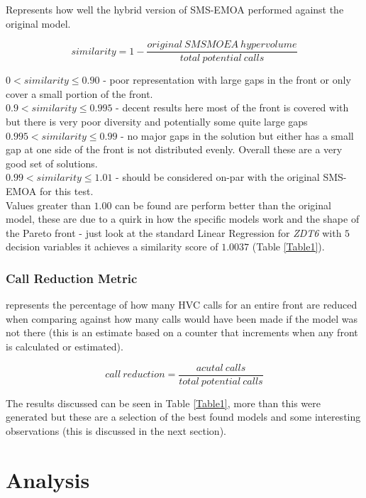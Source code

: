 \documentclass[sigconf,review,nonacm]{acmart}
\begin{document}
Represents how well the hybrid version of SMS-EMOA performed against the original model.

$$
    similarity = 1 - \frac{original\ SMSMOEA\ hypervolume}{total\ potential\ calls}
$$

$0 < similarity \leq 0.90$ - poor representation with large gaps in the front or only cover a small portion of the front. \\

$0.9 < similarity \leq 0.995 $ - decent results here most of the front is covered with but there is very poor diversity and potentially some quite large gaps \\

$0.995 < similarity \leq 0.99 $ - no major gaps in the solution but either has a small gap at one side of the front is not distributed evenly. Overall these are a very good set of solutions.  \\

$0.99 < similarity \leq 1.01$ - should be considered on-par with the original SMS-EMOA for this test. \\ Values greater than $1.00$ can be found are perform better than the original model, these are due to a quirk in how the specific models work and the shape of the Pareto front - just look at the standard Linear Regression for \textit{ZDT6} with $5$ decision variables it achieves a similarity score of $1.0037$ (Table \ref{Table1}).

\subsubsection{Call Reduction Metric} 

represents the percentage of how many HVC calls for an entire front are reduced when comparing against how many calls would have been made if the model was not there (this is an estimate based on a counter that increments when any front is calculated or estimated).

$$
    call\ reduction = \frac{acutal\ calls}{total\ potential\ calls}
$$

The results discussed can be seen in Table \ref{Table1}, more than this were generated but these are a selection of the best found models and some interesting observations (this is discussed in the next section). 









 
\section{Analysis}
\end{document}
